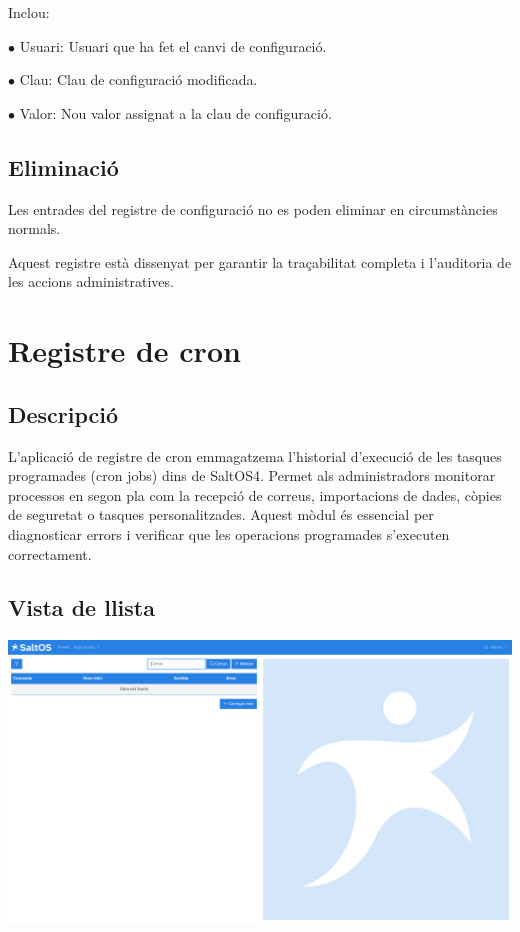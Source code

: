 \documentclass[a4paper]{article}
\begin{document}
Inclou:

\begin{compactitem}
\item[\color{myblue}$\bullet$] Usuari: Usuari que ha fet el canvi de configuració.
\item[\color{myblue}$\bullet$] Clau: Clau de configuració modificada.
\item[\color{myblue}$\bullet$] Valor: Nou valor assignat a la clau de configuració.
\end{compactitem}

\hypertarget{toc10}{}
\subsection{Eliminació}

Les entrades del registre de configuració no es poden eliminar en circumstàncies normals.

Aquest registre està dissenyat per garantir la traçabilitat completa i l'auditoria de les accions administratives.


\hypertarget{toc11}{}
\section{Registre de cron}

\hypertarget{toc12}{}
\subsection{Descripció}

L'aplicació de registre de cron emmagatzema l'historial d'execució de les tasques programades (cron jobs) dins de SaltOS4.
Permet als administradors monitorar processos en segon pla com la recepció de correus, importacions de dades, còpies de seguretat o tasques personalitzades.
Aquest mòdul és essencial per diagnosticar errors i verificar que les operacions programades s'executen correctament.

\hypertarget{toc13}{}
\subsection{Vista de llista}

\begin{center}\includegraphics[width=1\textwidth]{../ujest/snaps/test-screenshots-js-screenshots-common-cronlog-list-ca-es-1-snap.png}\end{center}
\end{document}
